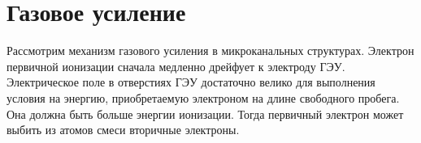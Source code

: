 \section{Газовое усиление}
\label{sec:gas_ampl}
Рассмотрим механизм газового усиления в микроканальных структурах. Электрон первичной ионизации сначала медленно дрейфует к электроду ГЭУ. Электрическое поле в отверстиях ГЭУ достаточно велико для выполнения условия на энергию, приобретаемую электроном на длине свободного пробега. Она должна быть больше энергии ионизации. Тогда первичный электрон может выбить из атомов смеси вторичные электроны.
\par

